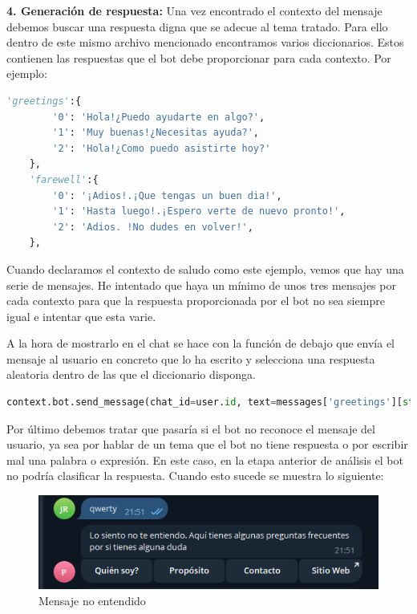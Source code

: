 \textbf{4. Generación de respuesta: }Una vez encontrado el contexto del mensaje debemos buscar una respuesta digna que se adecue al tema tratado. Para ello dentro de este mismo archivo mencionado encontramos varios diccionarios. Estos contienen las respuestas que el bot debe proporcionar para cada contexto. Por ejemplo:

\begin{lstlisting}[language=Python]
    'greetings':{
        '0': 'Hola!¿Puedo ayudarte en algo?',
        '1': 'Muy buenas!¿Necesitas ayuda?',
        '2': 'Hola!¿Como puedo asistirte hoy?'
    },
    'farewell':{
        '0': '¡Adios!.¡Que tengas un buen dia!',
        '1': 'Hasta luego!.¡Espero verte de nuevo pronto!',
        '2': 'Adios. !No dudes en volver!',
    },
\end{lstlisting}

Cuando declaramos el contexto de saludo como este ejemplo, vemos que hay una serie de mensajes. He intentado que haya un mínimo de unos tres mensajes por cada contexto para que la respuesta proporcionada por el bot no sea siempre igual e intentar que esta varie. \vspace{0.1cm}

A la hora de mostrarlo en el chat se hace con la función de debajo que envía el mensaje al usuario en concreto que lo ha escrito y selecciona una respuesta aleatoria dentro de las que el diccionario disponga.\vspace{0.3cm}

\begin{lstlisting}[language=Python]
context.bot.send_message(chat_id=user.id, text=messages['greetings'][str(random_var)])
\end{lstlisting}

Por último debemos tratar que pasaría si el bot no reconoce el mensaje del usuario, ya sea por hablar de un tema que el bot no tiene respuesta o por escribir mal una palabra o expresión. En este caso, en la etapa anterior de análisis el bot no podría clasificar la respuesta. Cuando esto sucede se muestra lo siguiente:\vspace{3cm}

\begin{figure}[!ht]
    \centering
    \includegraphics[width=1\textwidth]{imagenes/no_respuesta.png}
    \caption{ Mensaje no entendido }
    \label{fig:enter-label}
\end{figure}\vspace{0.3cm}

